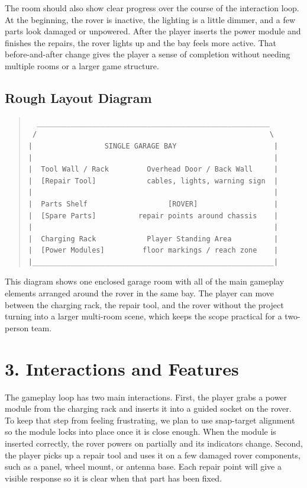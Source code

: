 \documentclass{article}
\begin{document}
The room should also show clear progress over the course of the interaction loop. At the beginning, the rover is inactive, the lighting is a little dimmer, and a few parts look damaged or unpowered. After the player inserts the power module and finishes the repairs, the rover lights up and the bay feels more active. That before-and-after change gives the player a sense of completion without needing multiple rooms or a larger game structure.

\newpage
\subsection*{Rough Layout Diagram}

\begin{quote}
	\small
	\begin{verbatim}
  _______________________________________________________
 /                                                       \
|                 SINGLE GARAGE BAY                       |
|                                                         |
|  Tool Wall / Rack         Overhead Door / Back Wall     |
|  [Repair Tool]            cables, lights, warning sign  |
|                                                         |
|  Parts Shelf                   [ROVER]                  |
|  [Spare Parts]          repair points around chassis    |
|                                                         |
|  Charging Rack            Player Standing Area          |
|  [Power Modules]         floor markings / reach zone    |
|_________________________________________________________|
\end{verbatim}
\end{quote}

This diagram shows one enclosed garage room with all of the main gameplay elements arranged around the rover in the same bay. The player can move between the charging rack, the repair tool, and the rover without the project turning into a larger multi-room scene, which keeps the scope practical for a two-person team.

\section*{3. Interactions and Features}

The gameplay loop has two main interactions. First, the player grabs a power module from the charging rack and inserts it into a guided socket on the rover. To keep that step from feeling frustrating, we plan to use snap-target alignment so the module locks into place once it is close enough. When the module is inserted correctly, the rover powers on partially and its indicators change. Second, the player picks up a repair tool and uses it on a few damaged rover components, such as a panel, wheel mount, or antenna base. Each repair point will give a visible response so it is clear when that part has been fixed.
\end{document}
